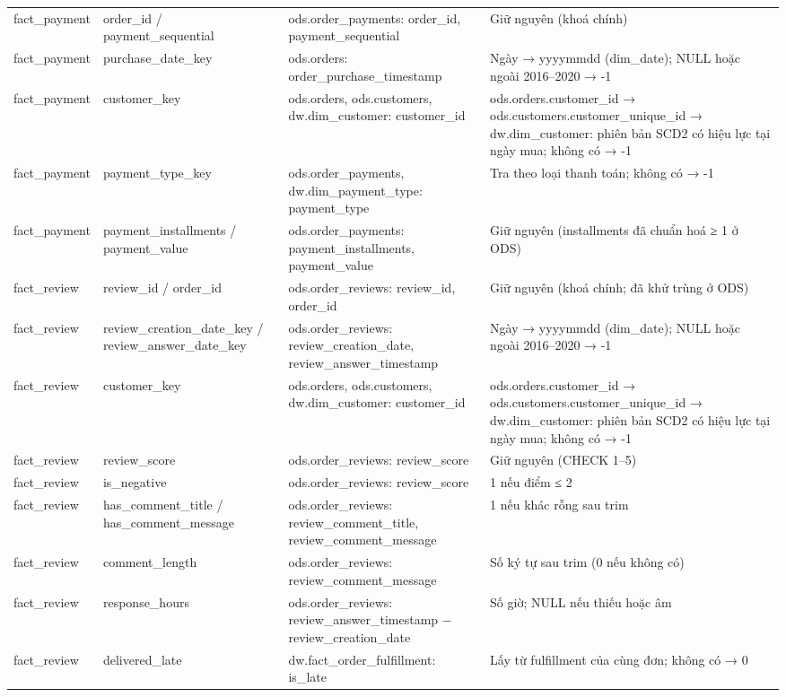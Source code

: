 {\begin{longtable}{p{2.4cm}p{3.1cm}p{3.6cm}p{5.4cm}}
fact\_payment & order\_id / payment\_sequential & ods.order\_payments: order\_id, payment\_sequential & Giữ nguyên (khoá chính) \\
fact\_payment & purchase\_date\_key & ods.orders: order\_purchase\_timestamp & Ngày → yyyymmdd (dim\_date); NULL hoặc ngoài 2016–2020 → -1 \\
fact\_payment & customer\_key & ods.orders, ods.customers, dw.dim\_customer: customer\_id & ods.orders.customer\_id → ods.customers.customer\_unique\_id → dw.dim\_customer: phiên bản SCD2 có hiệu lực tại ngày mua; không có → -1 \\
fact\_payment & payment\_type\_key & ods.order\_payments, dw.dim\_payment\_type: payment\_type & Tra theo loại thanh toán; không có → -1 \\
fact\_payment & payment\_installments / payment\_value & ods.order\_payments: payment\_installments, payment\_value & Giữ nguyên (installments đã chuẩn hoá ≥ 1 ở ODS) \\
fact\_review & review\_id / order\_id & ods.order\_reviews: review\_id, order\_id & Giữ nguyên (khoá chính; đã khử trùng ở ODS) \\
fact\_review & review\_creation\_date\_key / review\_answer\_date\_key & ods.order\_reviews: review\_creation\_date, review\_answer\_timestamp & Ngày → yyyymmdd (dim\_date); NULL hoặc ngoài 2016–2020 → -1 \\
fact\_review & customer\_key & ods.orders, ods.customers, dw.dim\_customer: customer\_id & ods.orders.customer\_id → ods.customers.customer\_unique\_id → dw.dim\_customer: phiên bản SCD2 có hiệu lực tại ngày mua; không có → -1 \\
fact\_review & review\_score & ods.order\_reviews: review\_score & Giữ nguyên (CHECK 1–5) \\
fact\_review & is\_negative & ods.order\_reviews: review\_score & 1 nếu điểm ≤ 2 \\
fact\_review & has\_comment\_title / has\_comment\_message & ods.order\_reviews: review\_comment\_title, review\_comment\_message & 1 nếu khác rỗng sau trim \\
fact\_review & comment\_length & ods.order\_reviews: review\_comment\_message & Số ký tự sau trim (0 nếu không có) \\
fact\_review & response\_hours & ods.order\_reviews: review\_answer\_timestamp − review\_creation\_date & Số giờ; NULL nếu thiếu hoặc âm \\
fact\_review & delivered\_late & dw.fact\_order\_fulfillment: is\_late & Lấy từ fulfillment của cùng đơn; không có → 0 \\

\end{longtable}}

